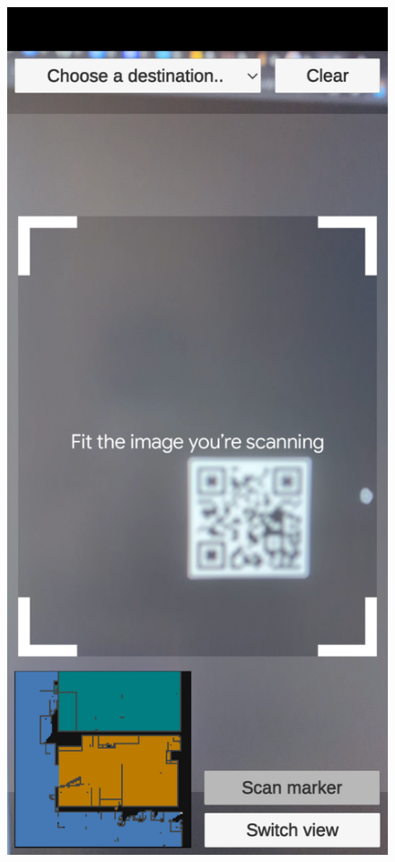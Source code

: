         \begin{figure}[!ht]
            \centering
            \begin{minipage}[b]{0.4\textwidth}
                \captionsetup{justification=centering}
                \includegraphics[width=\textwidth]{figures/demos/qr_scanning.png}

\end{minipage}
\end{figure}
